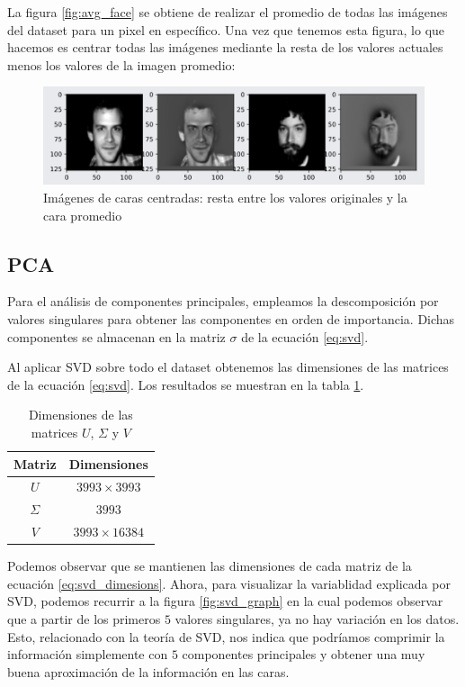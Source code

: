 \documentclass[conference]{IEEEtran}
\begin{document}
La figura \ref{fig:avg_face} se obtiene de realizar el promedio de todas las imágenes del dataset para un pixel en específico. Una vez que tenemos esta figura, lo que hacemos es centrar todas las imágenes mediante la resta de los valores actuales menos los valores de la imagen promedio: 

\begin{figure}[H]
    \centering
    \includegraphics[scale=0.2]{imgs/centered_images_avg.png}
    \caption{Imágenes de caras centradas: resta entre los valores originales y la cara promedio}
    \label{fig:imgs_minus_avg}
\end{figure}

\subsection{PCA}
Para el análisis de componentes principales, empleamos la descomposición por valores singulares para obtener las componentes en orden de importancia. Dichas componentes se almacenan en la matriz $\sigma$ de la ecuación \ref{eq:svd}. 

Al aplicar SVD sobre todo el dataset obtenemos las dimensiones de las matrices de la ecuación \ref{eq:svd}. Los resultados se muestran en la tabla \ref{tab:svd_dimensions}. 

\begin{table}[H]
    \centering
    \begin{tabular}{|c|c|}
         \hline
         Matriz & Dimensiones \\ \hline
         $U$ & $3993 \times 3993$ \\ \hline
         $\Sigma$ & $3993$ \\ \hline
         $V$ & $3993 \times 16384$ \\ \hline
    \end{tabular}
    \caption{Dimensiones de las matrices $U$, $\Sigma$ y $V$}
    \label{tab:svd_dimensions}
\end{table}

Podemos observar que se mantienen las dimensiones de cada matriz de la ecuación \ref{eq:svd_dimesions}. Ahora, para visualizar la variablidad explicada por SVD, podemos recurrir a la figura \ref{fig:svd_graph} en la cual podemos observar que a partir de los primeros $5$ valores singulares, ya no hay variación en los datos. Esto, relacionado con la teoría de SVD, nos indica que podríamos comprimir la información simplemente con $5$ componentes principales y obtener una muy buena aproximación de la información en las caras. 
\end{document}
